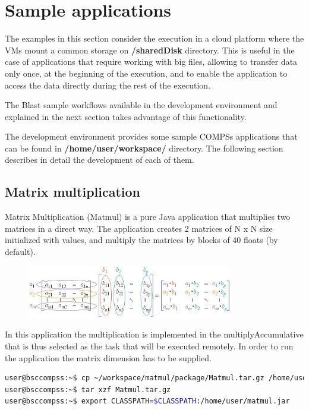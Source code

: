\section{Sample applications}
\label{sec:SampleApps}

The examples in this section consider the execution in a cloud platform where the VMs mount a common 
storage on {\bf /sharedDisk} directory. This is useful in the case of applications that require working 
with big files, allowing to transfer data only once, at the beginning of the execution, and to enable 
the application to access the data directly during the rest of the execution.

The Blast sample workflows available in the development environment and explained in the next section 
takes advantage of this functionality.

The development environment provides some sample COMPSs applications that can be found in 
{\bf /home/user/workspace/} directory. The following section describes in detail the development 
of each of them.

\subsection{Matrix multiplication}
Matrix Multiplication (Matmul) is a pure Java application that multiplies two matrices in a direct way. 
The application creates 2 matrices of N x N size initialized with values, and multiply the matrices by 
blocks of 40 floats (by default).

\begin{figure}[ht!]
  \centering
    \includegraphics[width=0.8\textwidth]{./Sections/4_Sample_Apps/Figures/matrix.jpeg}
\end{figure}

In this application the multiplication is implemented in the multiplyAccumulative that is thus selected 
as the task that will be executed remotely. In order to run the application the matrix dimension has to 
be supplied.

\begin{lstlisting}[language=bash]
user@bsccompss:~$ cp ~/workspace/matmul/package/Matmul.tar.gz /home/user/
user@bsccompss:~$ tar xzf Matmul.tar.gz
user@bsccompss:~$ export CLASSPATH=$CLASSPATH:/home/user/matmul.jar
\end{lstlisting}

